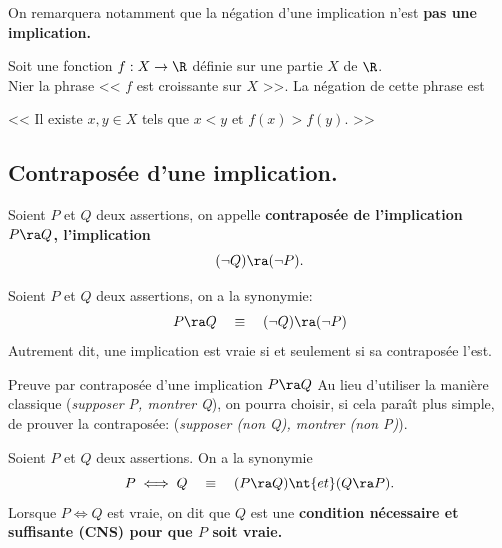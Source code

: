 \documentclass[11pt]{article}
\begin{document}
\vspace*{-0.8cm}

\warning On remarquera notamment que la négation d'une implication n'est \bf{pas} une implication.

\vspace*{0.3cm}

\begin{ex}{}{}
    Soit une fonction $f:X\to\R$ définie sur une partie $X$ de $\R$.\\
    Nier la phrase << $f$ est croissante sur $X$ >>.
    \tcblower
    La négation de cette phrase est
    \begin{center}
        << Il existe $x,y\in X$ tels que $x<y$ et $f(x)>f(y)$. >>
    \end{center}
\end{ex}

\subsection{Contraposée d'une implication.}

\begin{defi}{}{}
    Soient $P$ et $Q$ deux assertions, on appelle \bf{contraposée} de l'implication $P\ra Q$, l'implication
    \begin{equation*}
        (\lnot Q) \ra (\lnot P).
    \end{equation*}
\end{defi}

\begin{thm}{}{}
    Soient $P$ et $Q$ deux assertions, on a la synonymie:
    \begin{equation*}
        P \ra Q \quad \equiv \quad (\lnot Q) \ra (\lnot P)
    \end{equation*}
    Autrement dit, une implication est vraie si et seulement si sa contraposée l'est.
\end{thm}

\begin{meth}{Preuve par contraposée d'une implication $P\ra Q$}{}
    Au lieu d'utiliser la manière classique (\emph{supposer P, montrer Q}), on pourra choisir, si cela paraît plus simple, de prouver la contraposée: (\emph{supposer (non Q), montrer (non P)}).
\end{meth}

\begin{prop}{}{}
    Soient $P$ et $Q$ deux assertions. On a la synonymie
    \begin{equation*}
        P \iff Q \quad \equiv \quad (P \ra Q) \nt{ et } (Q\ra P).
    \end{equation*}
    Lorsque $P\iff Q$ est vraie, on dit que $Q$ est une \bf{condition nécessaire et suffisante} (CNS) pour que $P$ soit vraie.
\end{prop}
\end{document}
